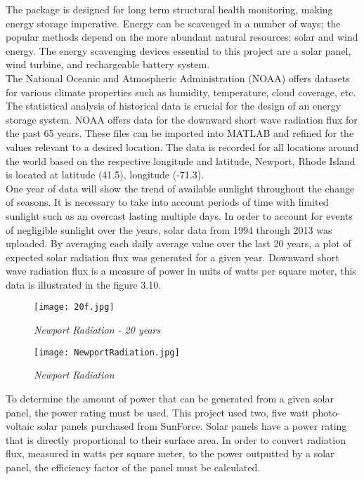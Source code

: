 \indent The package is designed for long term structural health monitoring, making energy storage imperative. 
Energy can be scavenged in a number of ways; the popular methods depend on the more abundant natural resources: solar and wind energy. 
The energy scavenging devices essential to this project are a solar panel, wind turbine, and rechargeable battery system.\\

\indent The National Oceanic and Atmospheric Administration (NOAA) offers datasets for various climate properties such as humidity, temperature, cloud coverage, etc. 
The statistical analysis of historical data is crucial for the design of an energy storage system. 
NOAA offers data for the downward short wave radiation flux for the past 65 years. 
These files can be imported into MATLAB and refined for the values relevant to a desired location. 
The data is recorded for all locations around the world based on the respective longitude and latitude, Newport, Rhode Island is located at latitude (41.5), longitude (-71.3). \\

\indent One year of data will show the trend of available sunlight throughout the change of seasons. 
It is necessary to take into account periods of time with limited sunlight such as an overcast lasting multiple days. 
In order to account for events of negligible sunlight over the years, solar data from 1994 through 2013 was uploaded. 
By averaging each daily average value over the last 20 years, a plot of expected solar radiation flux was generated for a given year. 
Downward short wave radiation flux is a measure of power in units of watts per square meter, this data is illustrated in the figure 3.10.

\begin{figure}[H]
\centering
\texttt{[image: 20f.jpg]}
\caption{\textit{Newport Radiation - 20 years}}
\label{fig:20 NewportRadtiation}
\end{figure}
\begin{figure}[H]
\centering
\texttt{[image: NewportRadiation.jpg]}
\caption{\textit{Newport Radiation}}
\label{fig:NewportRadtiation}
\end{figure}

\indent To determine the amount of power that can be generated from a given solar panel, the power rating must be used. 
This project used two, five watt photo-voltaic solar panels purchased from SunForce. 
Solar panels have a power rating that is directly proportional to their surface area. 
In order to convert radiation flux, measured in watts per square meter, to the power outputted by a solar panel, the efficiency factor of the panel must be calculated.


